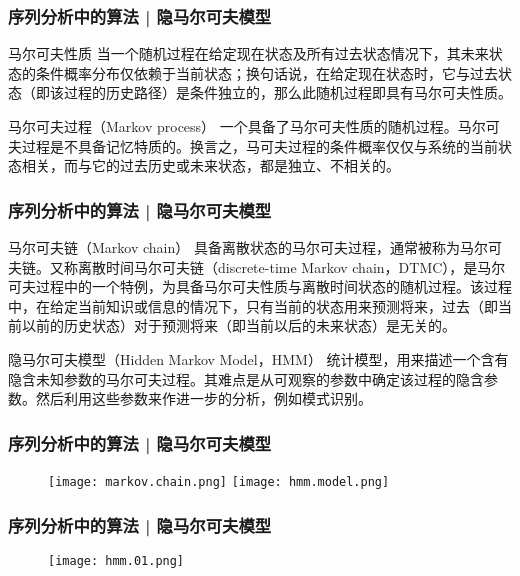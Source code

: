 \begin{frame}
  \frametitle{序列分析中的算法 | 隐马尔可夫模型}
  \begin{block}{马尔可夫性质}
    当一个随机过程在给定现在状态及所有过去状态情况下，其未来状态的条件概率分布仅依赖于当前状态；换句话说，在给定现在状态时，它与过去状态（即该过程的历史路径）是条件独立的，那么此随机过程即具有马尔可夫性质。
  \end{block}
  \pause
  \begin{block}{马尔可夫过程（Markov process）}
    一个具备了马尔可夫性质的随机过程。马尔可夫过程是不具备记忆特质的。换言之，马可夫过程的条件概率仅仅与系统的当前状态相关，而与它的过去历史或未来状态，都是独立、不相关的。
  \end{block}
\end{frame}

\begin{frame}
  \frametitle{序列分析中的算法 | 隐马尔可夫模型}
  \begin{block}{马尔可夫链（Markov chain）}
    具备离散状态的马尔可夫过程，通常被称为马尔可夫链。又称离散时间马尔可夫链（discrete-time Markov chain，DTMC），是马尔可夫过程中的一个特例，为具备马尔可夫性质与离散时间状态的随机过程。该过程中，在给定当前知识或信息的情况下，只有当前的状态用来预测将来，过去（即当前以前的历史状态）对于预测将来（即当前以后的未来状态）是无关的。
  \end{block}
  \pause
  \begin{block}{隐马尔可夫模型（Hidden Markov Model，HMM）}
    统计模型，用来描述一个含有隐含未知参数的马尔可夫过程。其难点是从可观察的参数中确定该过程的隐含参数。然后利用这些参数来作进一步的分析，例如模式识别。
  \end{block}
\end{frame}

\begin{frame}
  \frametitle{序列分析中的算法 | 隐马尔可夫模型}
  \begin{figure}
    \centering
    \texttt{[image: markov.chain.png]}
    \quad
    \texttt{[image: hmm.model.png]}
  \end{figure}
\end{frame}

\begin{frame}
  \frametitle{序列分析中的算法 | 隐马尔可夫模型}
  \begin{figure}
    \centering
    \texttt{[image: hmm.01.png]}
  \end{figure}
\end{frame}

